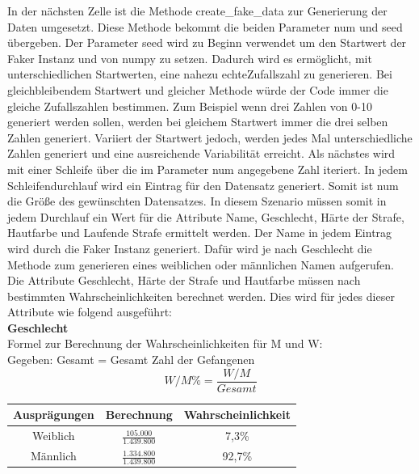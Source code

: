 \begin{onehalfspace}
In der nächsten Zelle ist die Methode \glqq{}create\_fake\_data\grqq{} zur Generierung der Daten umgesetzt. Diese Methode bekommt die beiden Parameter num und seed übergeben. Der Parameter seed wird zu Beginn verwendet um den Startwert der Faker Instanz und von \glqq{}numpy\grqq{} zu setzen. Dadurch wird es ermöglicht, mit unterschiedlichen Startwerten, eine nahezu \glqq{}echte\grqq{}Zufallszahl zu generieren. Bei gleichbleibendem Startwert und gleicher Methode würde der Code immer die gleiche Zufallszahlen bestimmen. Zum Beispiel wenn drei Zahlen von 0-10 generiert werden sollen, werden bei gleichem Startwert immer die drei selben Zahlen generiert. Variiert der Startwert jedoch, werden jedes Mal unterschiedliche Zahlen generiert und eine ausreichende Variabilität erreicht. Als nächstes wird mit einer Schleife über die im Parameter num angegebene Zahl iteriert. In jedem Schleifendurchlauf wird ein Eintrag für den Datensatz generiert. Somit ist num die Größe des gewünschten Datensatzes. In diesem Szenario müssen somit in jedem Durchlauf ein Wert für die Attribute Name, Geschlecht, Härte der Strafe, Hautfarbe und Laufende Strafe ermittelt werden. Der Name in jedem Eintrag wird durch die Faker Instanz generiert. Dafür wird je nach Geschlecht die Methode zum generieren eines weiblichen oder männlichen Namen aufgerufen. Die Attribute Geschlecht, Härte der Strafe und Hautfarbe müssen nach bestimmten Wahrscheinlichkeiten berechnet werden. Dies wird für jedes dieser Attribute wie folgend ausgeführt:\\
\textbf{Geschlecht}\\
Formel zur Berechnung der Wahrscheinlichkeiten für \ac{M} und \ac{W}:\\
Gegeben: Gesamt = Gesamt Zahl der Gefangenen\\
\begin{equation}
    W/M\% = \frac{W/M}{Gesamt}\label{eq:Sz1Mänlich}
\end{equation}
\begin{table}[h]
    \centering
    \begin{tabular}{|c|c|c|}
    \hline
    \textbf{Ausprägungen} & \textbf{Berechnung} & \textbf{Wahrscheinlichkeit} \\ \hline
    Weiblich              &\rule{0pt}{18pt} $\frac{105.000}{1.439.800}$  & 7,3\% \\[8pt] \hline
    Männlich              & \rule{0pt}{18pt}$\frac{1.334.800}{1.439.800}$     & 92,7\%  \\[8pt] \hline
    \end{tabular}

\end{table}
\end{onehalfspace}
